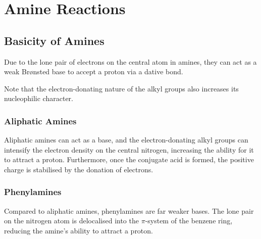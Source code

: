 





	\pagebreak
	\section{Amine Reactions}

		\subsection{Basicity of Amines}

			Due to the lone pair of electrons on the central  atom in amines, they can act as a weak Brønsted base to accept a proton
			via a dative bond.

			Note that the electron-donating nature of the alkyl groups also increases its nucleophilic character.

			\subsubsection{Aliphatic Amines}

				Aliphatic amines can act as a base, and the electron-donating alkyl groups can intensify the electron density on the
				central nitrogen, increasing the ability for it to attract a proton. Furthermore, once the conjugate acid is formed, the
				positive charge is stabilised by the donation of electrons.



			\subsubsection{Phenylamines}

				Compared to aliphatic amines, phenylamines are far weaker bases. The lone pair on the nitrogen atom is delocalised into
				the $\pi$-system of the benzene ring, reducing the amine's ability to attract a proton.

